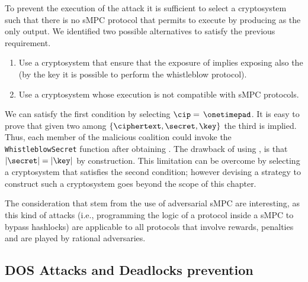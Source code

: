 To prevent the execution of the attack it is sufficient to select a cryptosystem \cipvocabulary such that there is no sMPC protocol that permits to execute \dec by producing \secret as the only output.
We identified two possible alternatives to satisfy the previous requirement.

\begin{enumerate}
	\item Use a cryptosystem that ensure that the exposure of \secret implies exposing also the \key (by the key it is possible to perform the whistleblow protocol).
	\item Use a cryptosystem whose execution is not compatible with sMPC protocols.
\end{enumerate}

We can satisfy the first condition by selecting $ \mathcal{\cip}=$$ \text{ }\onetimepad$. 
It is easy to prove that given two among $\{ \ciphertext , \secret , \key \}$ the third is implied. 
Thus, each member of the malicious coalition could invoke the \texttt{WhistleblowSecret} function after obtaining \secret. 
The drawback of using \onetimepad, is that $|\secret| = |\key|$ by construction. 
This limitation can be overcome by selecting a cryptosystem that satisfies the second condition; however devising a strategy to construct such a cryptosystem goes beyond the scope of this chapter.

The consideration that stem from the use of adversarial sMPC are interesting, as this kind of attacks (i.e., programming the logic of a protocol inside a sMPC to bypass hashlocks) are applicable to all protocols that involve rewards, penalties and are played by rational adversaries.

\subsection{DOS Attacks and Deadlocks prevention}

